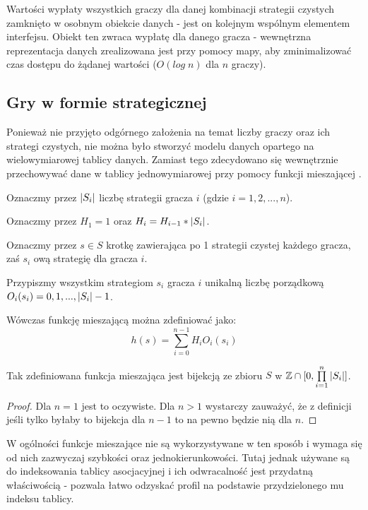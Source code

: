 \documentclass[polish]{standalone}
\begin{document}
Wartości wypłaty wszystkich graczy dla danej kombinacji strategii czystych zamknięto w osobnym obiekcie danych - jest on
kolejnym wspólnym elementem interfejsu. Obiekt ten zwraca wypłatę dla danego gracza - wewnętrzna reprezentacja danych
zrealizowana jest przy pomocy mapy, aby zminimalizować czas dostępu do żądanej wartości ($O(log\;n)$ dla $n$ graczy).

\subsection{Gry w formie strategicznej}

Ponieważ nie przyjęto odgórnego założenia na temat liczby graczy oraz ich strategi czystych, nie można było stworzyć
modelu danych opartego na wielowymiarowej tablicy danych. Zamiast tego zdecydowano się wewnętrznie przechowywać dane
w tablicy jednowymiarowej przy pomocy funkcji mieszającej .

Oznaczmy przez $|S_i|$ liczbę strategii gracza $i$ (gdzie $i = 1, 2, ..., n$).

Oznaczmy przez $H_1 = 1$ oraz $H_i = H_{i-1} * |S_i|$.

Oznaczmy przez $s \in S$ krotkę zawierająca po 1 strategii czystej każdego gracza, zaś $s_i$ ową strategię
dla gracza $i$.

Przypiszmy wszystkim strategiom $s_i$ gracza $i$ unikalną liczbę porządkową $O_i(s_i) = 0, 1, ..., |S_i|-1$.

Wówczas funkcję mieszającą można zdefiniować jako:
$$h(s) = \sum\limits_{i=0}^{n-1} H_i O_i(s_i)$$

\begin{theorem}
Tak zdefiniowana funkcja mieszająca jest bijekcją ze zbioru $S$ w $ \mathbb{Z} \cap [0, \prod\limits_{i=1}^{n} |S_i|] $.
\end{theorem}

\begin{proof}
Dla $n = 1$ jest to oczywiste. Dla $n > 1$ wystarczy zauważyć, że z definicji jeśli tylko byłaby to bijekcja dla $n-1$
to na pewno będzie nią dla $n$.
\end{proof}

W ogólności funkcje mieszające nie są wykorzystywane w ten sposób i wymaga się od nich zazwyczaj szybkości oraz
jednokierunkowości. Tutaj jednak używane są do indeksowania tablicy asocjacyjnej i ich odwracalność jest przydatną
właściwością - pozwala łatwo odzyskać profil na podstawie przydzielonego mu indeksu tablicy.
\end{document}
